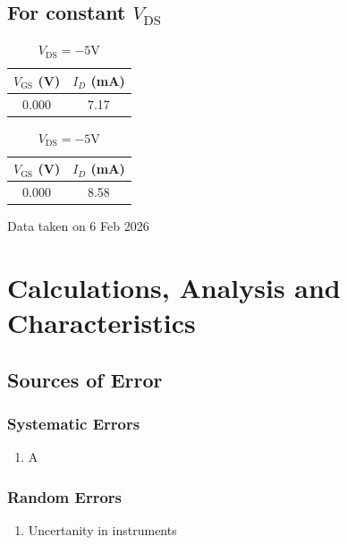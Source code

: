\documentclass[%
sor,
 jor,
 amsmath,amssymb,
 reprint,
]{revtex4-2}
\begin{document}
\subsection{For constant $V_{\text{DS}}$}
\begin{table}[H]
\begin{minipage}{0.48\linewidth}
	\begin{center}
\begin{tabular}{|c|c|}
\hline
$V_{\text{GS}}$  (V) & $I_D$ (mA) \\
\hline
0.000 & 7.17 \\
\hline
\end{tabular}
\caption{$V_{\text{DS}} = -2.65\si{\volt}$}
\end{center}
\end{minipage}
\begin{minipage}{0.48\linewidth}
	\begin{center}


\begin{tabular}{|c|c|}
\hline
$V_{\text{GS}}$  (V) & $I_D$ (mA) \\
\hline
0.000 & 8.58 \\
\hline
\end{tabular}
\caption{$V_{\text{DS}} = -5\si{\volt}$}
\end{center}
\end{minipage}
\hfill
\end{table}
\begin{center}
	Data taken on 6 Feb 2026 
\end{center}

\section{Calculations, Analysis and Characteristics}
\subsection{Sources of Error}
\subsubsection{Systematic Errors}
\begin{enumerate}
	\item A
\end{enumerate}
\subsubsection{Random Errors}
\begin{enumerate}
	\item Uncertanity in instruments
\end{enumerate}
\end{document}
